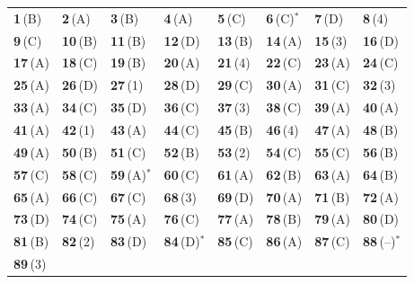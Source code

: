 {\small\setlength{\tabcolsep}{1pt}\renewcommand{\arraystretch}{1.5}
\begin{tabularx}{\linewidth}{@{}*{8}{>{\centering\arraybackslash}X}@{}}\toprule
\textbf{1}\,(B) & \textbf{2}\,(A) & \textbf{3}\,(B) & \textbf{4}\,(A) & \textbf{5}\,(C) & \textbf{6}\,(C)$^{*}$ & \textbf{7}\,(D) & \textbf{8}\,(4)\\
\textbf{9}\,(C) & \textbf{10}\,(B) & \textbf{11}\,(B) & \textbf{12}\,(D) & \textbf{13}\,(B) & \textbf{14}\,(A) & \textbf{15}\,(3) & \textbf{16}\,(D)\\
\textbf{17}\,(A) & \textbf{18}\,(C) & \textbf{19}\,(B) & \textbf{20}\,(A) & \textbf{21}\,(4) & \textbf{22}\,(C) & \textbf{23}\,(A) & \textbf{24}\,(C)\\
\textbf{25}\,(A) & \textbf{26}\,(D) & \textbf{27}\,(1) & \textbf{28}\,(D) & \textbf{29}\,(C) & \textbf{30}\,(A) & \textbf{31}\,(C) & \textbf{32}\,(3)\\
\textbf{33}\,(A) & \textbf{34}\,(C) & \textbf{35}\,(D) & \textbf{36}\,(C) & \textbf{37}\,(3) & \textbf{38}\,(C) & \textbf{39}\,(A) & \textbf{40}\,(A)\\
\textbf{41}\,(A) & \textbf{42}\,(1) & \textbf{43}\,(A) & \textbf{44}\,(C) & \textbf{45}\,(B) & \textbf{46}\,(4) & \textbf{47}\,(A) & \textbf{48}\,(B)\\
\textbf{49}\,(A) & \textbf{50}\,(B) & \textbf{51}\,(C) & \textbf{52}\,(B) & \textbf{53}\,(2) & \textbf{54}\,(C) & \textbf{55}\,(C) & \textbf{56}\,(B)\\
\textbf{57}\,(C) & \textbf{58}\,(C) & \textbf{59}\,(A)$^{*}$ & \textbf{60}\,(C) & \textbf{61}\,(A) & \textbf{62}\,(B) & \textbf{63}\,(A) & \textbf{64}\,(B)\\
\textbf{65}\,(A) & \textbf{66}\,(C) & \textbf{67}\,(C) & \textbf{68}\,(3) & \textbf{69}\,(D) & \textbf{70}\,(A) & \textbf{71}\,(B) & \textbf{72}\,(A)\\
\textbf{73}\,(D) & \textbf{74}\,(C) & \textbf{75}\,(A) & \textbf{76}\,(C) & \textbf{77}\,(A) & \textbf{78}\,(B) & \textbf{79}\,(A) & \textbf{80}\,(D)\\
\textbf{81}\,(B) & \textbf{82}\,(2) & \textbf{83}\,(D) & \textbf{84}\,(D)$^{*}$ & \textbf{85}\,(C) & \textbf{86}\,(A) & \textbf{87}\,(C) & \textbf{88}\,(--)$^{*}$\\
\textbf{89}\,(3) &  &  &  &  &  &  & \\\bottomrule\end{tabularx}}\par\smallskip
